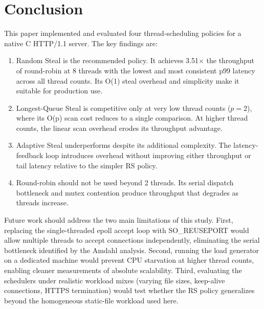 \documentclass[conference]{IEEEtran}
\begin{document}
\section{Conclusion}

This paper implemented and evaluated four thread-scheduling policies for a native C HTTP/1.1 server. The key findings are:

\begin{enumerate}
    \item Random Steal is the recommended policy. It achieves 3.51$\times$ the throughput of round-robin at 8 threads with the lowest and most consistent p99 latency across all thread counts. Its O(1) steal overhead and simplicity make it suitable for production use.
    \item Longest-Queue Steal is competitive only at very low thread counts ($p=2$), where its O(p) scan cost reduces to a single comparison. At higher thread counts, the linear scan overhead erodes its throughput advantage.
    \item Adaptive Steal underperforms despite its additional complexity. The latency-feedback loop introduces overhead without improving either throughput or tail latency relative to the simpler RS policy.
    \item Round-robin should not be used beyond 2 threads. Its serial dispatch bottleneck and mutex contention produce throughput that degrades as threads increase.
\end{enumerate}

Future work should address the two main limitations of this study. First, replacing the single-threaded epoll accept loop with SO\_REUSEPORT would allow multiple threads to accept connections independently, eliminating the serial bottleneck identified by the Amdahl analysis. Second, running the load generator on a dedicated machine would prevent CPU starvation at higher thread counts, enabling cleaner measurements of absolute scalability. Third, evaluating the schedulers under realistic workload mixes (varying file sizes, keep-alive connections, HTTPS termination) would test whether the RS policy generalizes beyond the homogeneous static-file workload used here.
\end{document}

